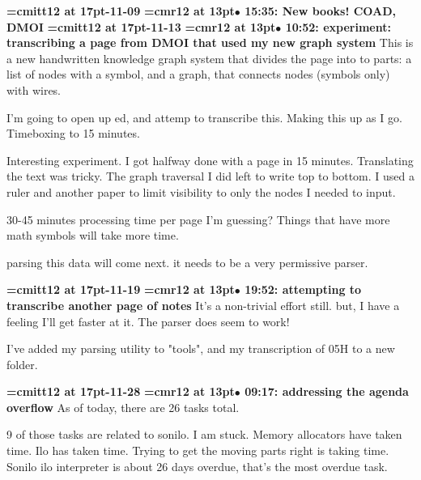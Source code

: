 {\medskip\noindent\bf\font\titlefont=cmitt12 at 17pt-11-09}\medskip
{\smallskip\noindent\bf\font\titlefont=cmr12 at 13pt\titlefont $\bullet$ 15:35: New books! COAD, DMOI}\smallskip
{\medskip\noindent\bf\font\titlefont=cmitt12 at 17pt-11-13}\medskip
{\smallskip\noindent\bf\font\titlefont=cmr12 at 13pt\titlefont $\bullet$ 10:52: experiment: transcribing a page from DMOI that used my new graph system}\smallskip
This is a new handwritten knowledge graph system that divides the page into to parts: a list of nodes with a symbol, and a graph, that connects nodes (symbols only) with wires.
\par

I'm going to open up ed, and attemp to transcribe this. Making this up as I go. Timeboxing to 15 minutes.
\par

Interesting experiment. I got halfway done with a page in 15 minutes. Translating the text was tricky. The graph traversal I did left to write top to bottom. I used a ruler and another paper to limit visibility to only the nodes I needed to input.
\par

30-45 minutes processing time per page I'm guessing? Things that have more math symbols will take more time.
\par

parsing this data will come next. it needs to be a very permissive parser.
\par

{\medskip\noindent\bf\font\titlefont=cmitt12 at 17pt-11-19}\medskip
{\smallskip\noindent\bf\font\titlefont=cmr12 at 13pt\titlefont $\bullet$ 19:52: attempting to transcribe another page of notes}\smallskip
It's a non-trivial effort still. but, I have a feeling I'll get faster at it. The parser does seem to work!
\par

I've added my parsing utility to "tools", and my transcription of 05H to a new folder.
\par

{\medskip\noindent\bf\font\titlefont=cmitt12 at 17pt-11-28}\medskip
{\smallskip\noindent\bf\font\titlefont=cmr12 at 13pt\titlefont $\bullet$ 09:17: addressing the agenda overflow}\smallskip
As of today, there are 26 tasks total.
\par

9 of those tasks are related to sonilo. I am stuck. Memory allocators have taken time. Ilo has taken time. Trying to get the moving parts right is taking time. Sonilo ilo interpreter is about 26 days overdue, that's the most overdue task.
\par

